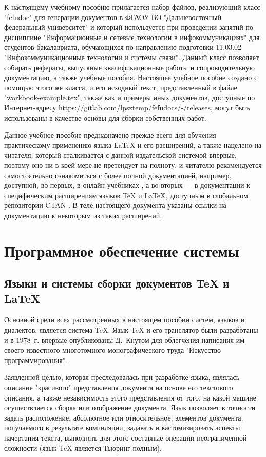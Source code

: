 \documentclass[workbook, draught]{fefudoc}
\begin{document}
К настоящему учебному пособию прилагается набор файлов, реализующий класс "fefudoc" для генерации документов в ФГАОУ ВО "Дальневосточный федеральный университет" и который используется при проведении занятий по дисциплине "Информационные и сетевые технологии в инфокоммуникациях" для студентов бакалавриата, обучающихся по направлению подготовки 11.03.02 "Инфокоммуникационные технологии и системы связи".
Данный класс позволяет собирать рефераты, выпускные квалификационные работы и сопроводительную документацию, а также учебные пособия.
Настоящее учебное пособие создано с помощью этого же класса, и его исходный текст, представленный в файле "workbook-example.tex", также как и примеры иных документов, доступные по Интернет-адресу \url{https://gitlab.com/lpsztemp/fefudocs/-/releases}, могут быть использованы в качестве основы для сборки собственных работ.

Данное учебное пособие предназначено прежде всего для обучения практическому применению языка \LaTeX{} и его расширений, а также нацелено на читателя, который сталкивается с данной издательской системой впервые, поэтому оно ни в коей мере не претендует на полноту, и читателю рекомендуется самостоятельно ознакомиться с более полной документацией, например, доступной, во-первых, в онлайн-учебниках \cite{latex-wikibooks, latex-overleaf}, а во-вторых --- в документации к специфическим расширениям языков \TeX{} и \LaTeX{}, доступным в глобальном репозитории CTAN \cite{CTAN}.
В теле настоящего документа указаны ссылки на документацию к некоторым из таких расширений.

\chapter{Программное обеспечение системы}
\section{Языки и системы сборки документов \TeX{} и \LaTeX{}}
Основной среди всех рассмотренных в настоящем пособии систем, языков и диалектов, является система \TeX{}.
Язык \TeX{} и его транслятор были разработаны и в 1978~г. впервые опубликованы Д.~Кнутом для облегчения написания им своего известного многотомного монографического труда "Искусство программирования".

Заявленной целью, которая преследовалась при разработке языка, являлась описание "красивого" \cite{TheTexBook} представления документа на основе его текстового описания, а также независимость этого представления от того, на какой машине осуществляется сборка или отображение документа.
Язык позволяет в точности задать расположение, абсолютное или относительное, элементов документа, получаемого в результате компиляции, задавать и кастомизировать аспекты начертания текста, выполнять для этого составные операции неограниченной сложности (язык \TeX{} является Тьюринг-полным).
\end{document}
